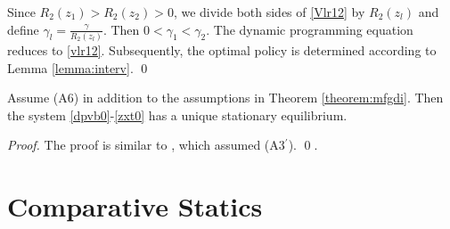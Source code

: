 \documentclass[graybox]{svmult}
\begin{document}
\proof Since $R_2(z_1)> R_2(z_2)>0$, we divide both sides of \eqref{Vlr12} by $R_2(z_l)$ and define
$
\gamma_l= \frac{\gamma}{R_2(z_l)}.
$
Then $0<\gamma_1<\gamma_2$. The dynamic programming equation reduces to \eqref{vlr12}.
Subsequently, the optimal policy is determined according to Lemma \ref{lemma:interv}. \qed






\begin{corollary}\label{cor:uni}
Assume (A6) in addition to the assumptions in Theorem \ref{theorem:mfgdi}. Then the system \eqref{dpvb0}-\eqref{zxt0}  has a unique stationary equilibrium.
\end{corollary}

\begin{proof}
The proof is similar to \cite{HM16Chen,HM17}, which assumed (A3$^\prime$). \qed.
\end{proof}




\section{Comparative Statics}
\label{sec:cs}
\end{document}
